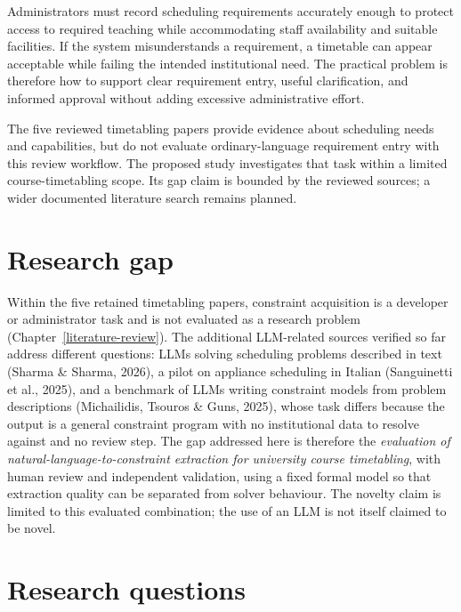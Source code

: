 \documentclass[
  11pt,a4paper,oneside]{report}
\begin{document}
Administrators must record scheduling requirements accurately enough to protect access to required teaching while accommodating staff availability and suitable facilities. If the system misunderstands a requirement, a timetable can appear acceptable while failing the intended institutional need. The practical problem is therefore how to support clear requirement entry, useful clarification, and informed approval without adding excessive administrative effort.

The five reviewed timetabling papers provide evidence about scheduling needs and capabilities, but do not evaluate ordinary-language requirement entry with this review workflow. The proposed study investigates that task within a limited course-timetabling scope. Its gap claim is bounded by the reviewed sources; a wider documented literature search remains planned.

\hypertarget{research-gap}{%
\section{Research gap}\label{research-gap}}

Within the five retained timetabling papers, constraint acquisition is a developer or
administrator task and is not evaluated as a research problem (Chapter~\ref{literature-review}). The additional LLM-related sources verified so far address
different questions: LLMs solving scheduling problems described in text
(Sharma \& Sharma, 2026), a pilot on appliance scheduling in Italian
(Sanguinetti et al., 2025), and a benchmark of LLMs writing constraint
models from problem descriptions (Michailidis, Tsouros \& Guns, 2025),
whose task differs because the output is a general constraint program
with no institutional data to resolve against and no review step. The
gap addressed here is therefore the \emph{evaluation of
natural-language-to-constraint extraction for university course
timetabling}, with human review and independent validation, using a
fixed formal model so that extraction quality can be separated from
solver behaviour. The novelty claim is limited to this evaluated
combination; the use of an LLM is not itself claimed to be novel.

\hypertarget{research-questions}{%
\section{Research questions}\label{research-questions}}
\end{document}

